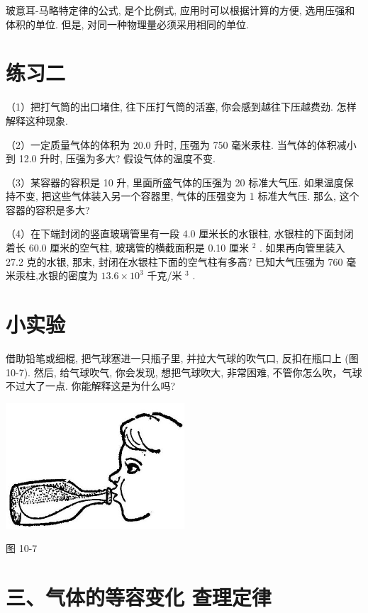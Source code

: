 \documentclass[10pt]{article}
\begin{document}
玻意耳-马略特定律的公式, 是个比例式, 应用时可以根据计算的方便, 选用压强和体积的单位. 但是, 对同一种物理量必须采用相同的单位.

\section*{练习二}

（1）把打气筒的出口堵住, 往下压打气筒的活塞, 你会感到越往下压越费劲. 怎样解释这种现象.

（2）一定质量气体的体积为 20.0 升时, 压强为 750 毫米汞柱. 当气体的体积减小到 12.0 升时, 压强为多大? 假设气体的温度不变.

（3）某容器的容积是 10 升, 里面所盛气体的压强为 20 标准大气压. 如果温度保持不变, 把这些气体装入另一个容器里, 气体的压强变为 1 标准大气压. 那么, 这个容器的容积是多大?

（4）在下端封闭的竖直玻璃管里有一段 4.0 厘米长的水银柱, 水银柱的下面封闭着长 60.0 厘米的空气柱, 玻璃管的横截面积是 0.10 厘米 \({}^{2}\) . 如果再向管里装入 27.2 克的水银, 那末, 封闭在水银柱下面的空气柱有多高? 已知大气压强为 760 毫米汞柱,水银的密度为 \({13.6} \times {10}^{3}\) 千克/米 \({}^{3}\) .

\section*{小实验}

借助铅笔或细棍, 把气球塞进一只瓶子里, 并拉大气球的吹气口, 反扣在瓶口上 (图 10-7). 然后, 给气球吹气, 你会发现, 想把气球吹大, 非常困难, 不管你怎么吹，气球不过大了一点. 你能解释这是为什么吗?

\begin{center}
\includegraphics[max width=0.5\textwidth]{images/01912d55-147c-70aa-b0e0-1782a122f948_288_782592.jpg}
\end{center}

图 10-7

\section*{三、气体的等容变化 查理定律}
\end{document}
